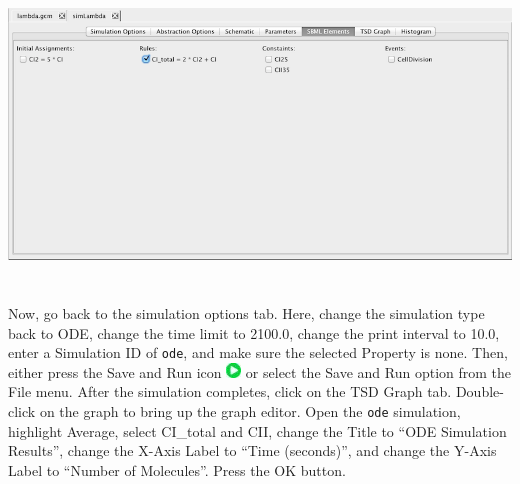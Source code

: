 \documentclass[titlepage,11pt]{article}
\begin{document}
\begin{center}
\includegraphics[height=80mm]{screenshots/SBMLElements}
\end{center}

Now, go back to the simulation options tab.  Here, change the simulation type back to ODE, change the time limit to 2100.0, change the print interval to 10.0, enter a Simulation ID of {\tt ode}, and make sure the selected Property is none.  Then, either press the Save and Run icon \includegraphics{../gui/icons/run-icon} or select the Save and Run option from the File menu.
After the simulation completes, click on the TSD Graph tab.  Double-click on the graph to bring up the graph editor.
Open the {\tt ode} simulation, highlight Average, select CI\_total and CII, change the Title to ``ODE Simulation Results'', change the X-Axis Label to ``Time (seconds)'', and change the Y-Axis Label to ``Number of Molecules''.  
Press the OK button.  
 
\end{document}
